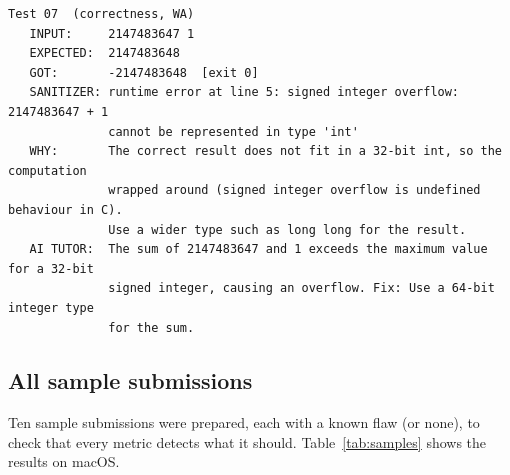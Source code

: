 \documentclass[11pt,a4paper]{article}
\begin{document}
\noindent\begin{minipage}{\linewidth}
\begin{lstlisting}[basicstyle=\ttfamily\footnotesize]
Test 07  (correctness, WA)
   INPUT:     2147483647 1
   EXPECTED:  2147483648
   GOT:       -2147483648  [exit 0]
   SANITIZER: runtime error at line 5: signed integer overflow: 2147483647 + 1
              cannot be represented in type 'int'
   WHY:       The correct result does not fit in a 32-bit int, so the computation
              wrapped around (signed integer overflow is undefined behaviour in C).
              Use a wider type such as long long for the result.
   AI TUTOR:  The sum of 2147483647 and 1 exceeds the maximum value for a 32-bit
              signed integer, causing an overflow. Fix: Use a 64-bit integer type
              for the sum.
\end{lstlisting}
\end{minipage}

\subsection{All sample submissions}
Ten sample submissions were prepared, each with a known flaw (or none), to check that every metric detects what it
should. Table~\ref{tab:samples} shows the results on macOS.
\end{document}
